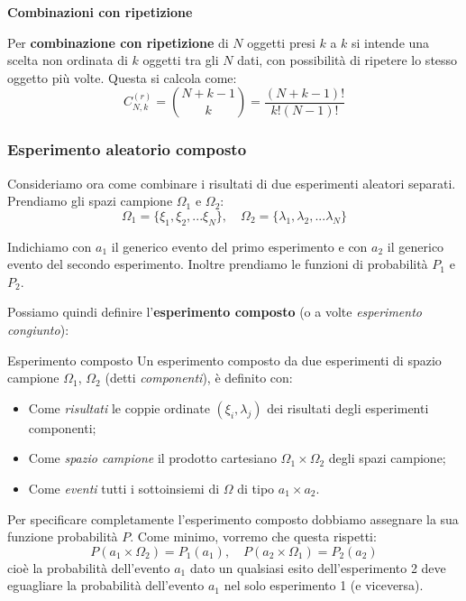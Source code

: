 \documentclass[a4paper,11pt]{article}
\begin{document}
\par\smallskip

\noindent
\textbf{\textsf{Combinazioni con ripetizione}}

\noindent
Per \textbf{combinazione con ripetizione} di $N$ oggetti presi $k$ a $k$ si intende una scelta non ordinata di $k$ oggetti tra gli $N$ dati, con possibilità di ripetere lo stesso oggetto più volte. Questa si calcola come:
$$
C^{(r)}_{N,k} =
\binom{N + k - 1}{k}
=
\frac{(N + k - 1)!}{k!(N - 1)!}
$$


\subsubsection{Esperimento aleatorio composto}
Consideriamo ora come combinare i risultati di due esperimenti aleatori separati. Prendiamo gli spazi campione $\Omega_1$ e $\Omega_2$:
$$
\Omega_1 = \{ \xi_1, \xi_2, ... \xi_N \}, \quad
\Omega_2 = \{ \lambda_1, \lambda_2, ... \lambda_N \}
$$

Indichiamo con $a_1$ il generico evento del primo esperimento e con $a_2$ il generico evento del secondo esperimento. Inoltre prendiamo le funzioni di probabilità $P_1$ e $P_2$.

Possiamo quindi definire l'\textbf{esperimento composto} (o a volte \textit{esperimento congiunto}):
\begin{definition}{Esperimento composto}
	Un esperimento composto da due esperimenti di spazio campione $\Omega_1$, $\Omega_2$ (detti \textit{componenti}), è definito con:
\begin{itemize}
	\item Come \textit{risultati} le coppie ordinate $(\xi_i, \lambda_j)$ dei risultati degli esperimenti componenti;
	\item Come \textit{spazio campione} il prodotto cartesiano $\Omega_1 \times \Omega_2$ degli spazi campione;
	\item Come \textit{eventi} tutti i sottoinsiemi di $\Omega$ di tipo $a_1 \times a_2$.
\end{itemize}
\end{definition}

Per specificare completamente l’esperimento composto dobbiamo assegnare la sua funzione probabilità $P$. Come minimo, vorremo che questa rispetti:
$$
P(a_1 \times \Omega_2) = P_1(a_1), \quad
P(a_2 \times \Omega_1) = P_2(a_2)
$$
cioè la probabilità dell'evento $a_1$ dato un qualsiasi esito dell'esperimento 2 deve eguagliare la probabilità dell'evento $a_1$ nel solo esperimento 1 (e viceversa). 
\end{document}
